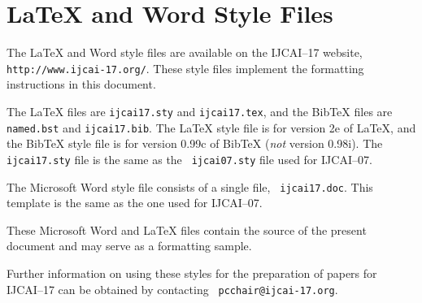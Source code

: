 \documentclass{article}
\theoremstyle{definition}
\begin{document}
\appendix

\section{\LaTeX{} and Word Style Files}\label{stylefiles}

The \LaTeX{} and Word style files are available on the IJCAI--17
website, {\tt http://www.ijcai-17.org/}.
These style files implement the formatting instructions in this
document.

The \LaTeX{} files are {\tt ijcai17.sty} and {\tt ijcai17.tex}, and
the Bib\TeX{} files are {\tt named.bst} and {\tt ijcai17.bib}. The
\LaTeX{} style file is for version 2e of \LaTeX{}, and the Bib\TeX{}
style file is for version 0.99c of Bib\TeX{} ({\em not} version
0.98i). The {\tt ijcai17.sty} file is the same as the {\tt
ijcai07.sty} file used for IJCAI--07.

The Microsoft Word style file consists of a single file, {\tt
ijcai17.doc}. This template is the same as the one used for
IJCAI--07.

These Microsoft Word and \LaTeX{} files contain the source of the
present document and may serve as a formatting sample.  

Further information on using these styles for the preparation of
papers for IJCAI--17 can be obtained by contacting {\tt
pcchair@ijcai-17.org}.



\end{document}
